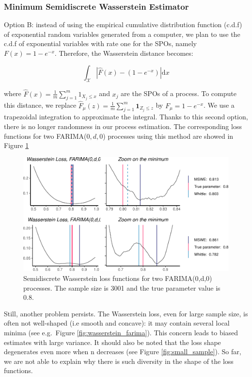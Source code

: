 \documentclass[
  11pt,
]{article}
\begin{document}
\hypertarget{minimum-semidiscrete-wasserstein-estimator}{%
\subsubsection{Minimum Semidiscrete Wasserstein
Estimator}\label{minimum-semidiscrete-wasserstein-estimator}}

Option B: instead of using the empirical cumulative distribution
function (c.d.f) of exponential random variables generated from a
computer, we plan to use the c.d.f of exponential variables with rate
one for the SPOs, namely \(F(x)=1-e^{-x}\). Therefore, the Wasserstein
distance becomes:

\begin{equation}
\int_\mathcal{X}\left|\hat F(x)- (1 - e^{-x})\right| \mathrm{d} x 
\end{equation}

where \(\hat F(x) = \frac{1}{m} \sum_{j=1}^{m} 1_{X_{j} \leq x}\) and
\(x_j\) are the SPOs of a process. To compute this distance, we replace
\(\hat F_\mu(z) = \frac{1}{m}\sum_{j=1}^{m} \mathbf{1}_{Z_{j} \leq z}\)
by \(F_\mu = 1 - e^{-x}\). We use a trapezoidal integration to
approximate the integral. Thanks to this second option, there is no
longer randomness in our process estimation. The corresponding loss
functions for two FARIMA(\(0,d,0\)) processes using this method are
showed in Figure \ref{fig:semi_wass}

\begin{figure}

{\centering \includegraphics[width=0.6\linewidth]{Master_thesis_V2_files/figure-latex/semi_wass-1} 

}

\caption{Semidiscrete Wasserstein loss functions for two FARIMA(0,d,0) processes. The sample size is 3001 and the true parameter value is 0.8.}\label{fig:semi_wass}
\end{figure}

Still, another problem persists. The Wasserstein loss, even for large
sample size, is often not well-shaped (i.e smooth and concave): it may
contain several local minima (see e.g.~Figure
\ref{fig:wasserstein_farima}). This concern leads to biased estimates
with large variance. It should also be noted that the loss shape
degenerates even more when n decreases (see Figure
\ref{fig:small_sample}). So far, we are not able to explain why there is
such diversity in the shape of the loss functions.
\end{document}
